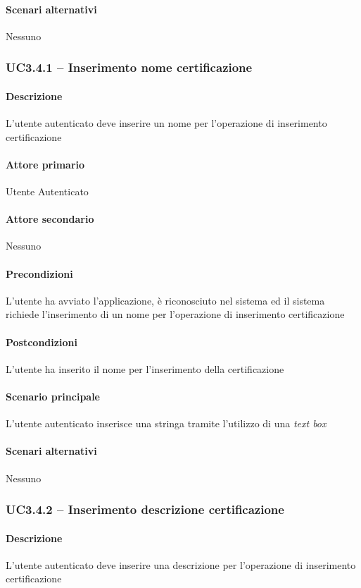 \paragraph{Scenari alternativi}  Nessuno



\subsubsection{UC3.4.1 – Inserimento nome certificazione}
\paragraph{Descrizione}  L’utente autenticato deve inserire un nome per l’operazione di inserimento certificazione
\paragraph{Attore primario}  Utente Autenticato
\paragraph{Attore secondario}  Nessuno
\paragraph{Precondizioni}  L’utente ha avviato l’applicazione, è riconosciuto nel sistema ed il sistema richiede l’inserimento di un nome per l’operazione di inserimento certificazione
\paragraph{Postcondizioni}  L’utente ha inserito il nome per l’inserimento della certificazione
\paragraph{Scenario principale}  
L’utente autenticato inserisce una stringa tramite l’utilizzo di una \textit{text box}
\paragraph{Scenari alternativi}  Nessuno



\subsubsection{UC3.4.2 – Inserimento descrizione certificazione}
\paragraph{Descrizione}  L’utente autenticato deve inserire una descrizione per l’operazione di inserimento certificazione
